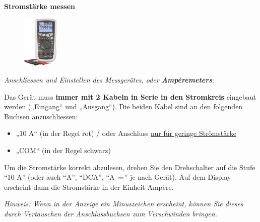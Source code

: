 \documentclass[11pt]{article}
\newcommand{\textdirectcurrent}{%
  \settowidth{\dimen0}{$=$}%
  \vbox to .85ex {\offinterlineskip
    \hbox to \dimen0{\leaders\hrule\hfill}
    \vskip.35ex
    \hbox to \dimen0{%
      \leaders\hrule\hskip.2\dimen0\hfill
      \leaders\hrule\hskip.2\dimen0\hfill
      \leaders\hrule\hskip.2\dimen0
    }
    \vfill
  }%
}
\newcommand{\mathdirectcurrent}{\mathrel{\textdirectcurrent}}
\begin{document}
\begin{tcolorbox}[width=\textwidth, %
    colback=white,colframe=gray!75!black]


\textbf{Stromstärke messen}

\vspace{0.2cm}

\begin{figure}
\vspace{-12pt}
  \centering
    \includegraphics[width=0.15\textwidth]{images/multimeter-vc-870.png}
\end{figure}

\textit{Anschliessen und Einstellen des Messgerätes, oder \textbf{Ampèremeters}}:


Das Gerät muss \textbf{immer mit 2 Kabeln in Serie in den Stromkreis} eingebaut werden („Eingang“ und  „Ausgang“). 
Die beiden Kabel sind an den folgenden Buchsen anzuschliessen: 


\begin{itemize}[label={--}]
    \item „10 A“   (in der Regel rot) / oder Anschluss \underline{nur für geringe Strömstärke}
    \item „COM“  (in der Regel schwarz)
\end{itemize}


Um die Stromstärke korrekt abzulesen, drehen Sie den Drehschalter auf die Stufe ``10 A'' (oder auch ``A'', ``DCA'',  ``A~$\mathdirectcurrent$''  je nach Gerät). Auf dem Display erscheint dann die Stromstärke in der Einheit Ampère. \vspace{0.2cm}

\textit{Hinweis: Wenn in der Anzeige ein Minuszeichen erscheint, können Sie dieses durch Vertauschen der Anschlussbuchsen zum Verschwinden bringen.}

\end{tcolorbox}
\vspace{0.5cm}
\end{document}
